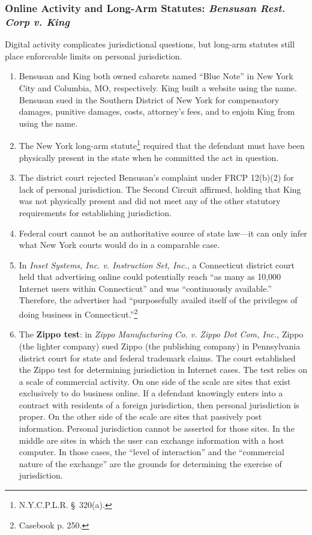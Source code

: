 \subsubsection{Online Activity and Long-Arm Statutes: \emph{Bensusan Rest. Corp 
v. King}}

Digital activity complicates jurisdictional questions, but long-arm statutes 
still place enforceable limits on personal jurisdiction.

\begin{enumerate}
    \item Bensusan and King both owned cabarets named ``Blue Note'' in New 
    York City and Columbia, MO, respectively. King built a website using the 
    name. Bensusan sued in the Southern District of New York for compensatory 
    damages, punitive damages, costs, attorney's fees, and to enjoin King from 
    using the name.
    \item The New York long-arm statute\footnote{N.Y.C.P.L.R. \S\ 320(a).} required that 
    the defendant must have been physically present in the state when he 
    committed the act in question.
    \item The district court rejected Bensusan's complaint under FRCP 12(b)(2) 
    for lack of personal jurisdiction. The Second Circuit affirmed, holding
    that King was not physically present and did not meet any of the other 
    statutory requirements for establishing jurisdiction.
    \item Federal court cannot be an authoritative source of state law---it 
    can only infer what New York courts would do in a comparable case.
    \item In \emph{Inset Systems, Inc. v. Instruction Set, Inc.}, a 
    Connecticut district court held that advertising online could potentially 
    reach ``as many as 10,000 Internet users within Connecticut'' and was 
    ``continuously available.'' Therefore, the advertiser had ``purposefully 
    availed itself of the privileges of doing business in 
    Connecticut.''\footnote{Casebook p. 250.}
    \item The \textbf{Zippo test}: in \emph{Zippo Manufacturing Co. v. Zippo 
    Dot Com, Inc.}, Zippo (the lighter company) sued Zippo (the publishing 
    company) in Pennsylvania district court for state and federal trademark 
    claims. The court established the Zippo test for determining jurisdiction 
    in Internet cases. The test relies on a scale of commercial activity. On 
    one side of the scale are sites that exist exclusively to do business 
    online.  If a defendant knowingly enters into a contract with residents of 
    a foreign jurisdiction, then personal jurisdiction is proper. On the other 
    side of the scale are sites that passively post information. Personal 
    jurisdiction cannot be asserted for those sites. In the middle are sites 
    in which the user can exchange information with a host computer. In those 
    cases, the ``level of interaction'' and the ``commercial nature of the 
    exchange'' are the grounds for determining the exercise of jurisdiction.  
    \end{enumerate}

